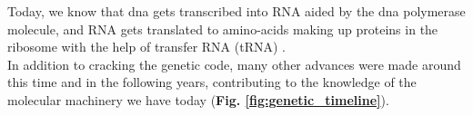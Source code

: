 Today, we know that \gls{dna} gets transcribed into RNA aided by the \gls{dna} polymerase molecule, and RNA gets translated to amino-acids making up proteins in the ribosome with the help of transfer RNA (tRNA) \cite{alberts2018molecular}.\\

In addition to cracking the genetic code, many other advances were made around this time and in the following years, contributing to the knowledge of the molecular machinery we have today (\textbf{Fig. \ref{fig:genetic_timeline}}).



